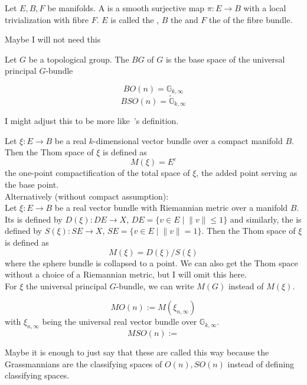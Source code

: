 \documentclass[a4paper,11pt]{article}
\begin{document}
\begin{definition}
    Let \(E,B,F\) be manifolds. A  is a smooth surjective map \(\pi:E\to B\) with a local trivialization with fibre \(F\).
    \(E\) is called the , \(B\) the  and \(F\) the  of the fibre bundle.
\end{definition}

Maybe I will not need this
\begin{definition}
    Let \(G\) be a topological group. The  \(BG\) of \(G\) is the base space of the universal principal \(G\)-bundle
\end{definition}

\begin{observation}
    \[BO(n)=\mathbb{G}_{k,\infty}\]
    \[BSO(n)=\widetilde{\mathbb{G}}_{k,\infty}\]
\end{observation}

I might adjust this to be more like\ \cite{thom}'s definition.
\begin{definition}
    Let \(\xi:E\to B\) be a real \(k\)-dimensional vector bundle over a compact manifold \(B\).
    Then the Thom space of \(\xi\) is defined as\[M(\xi)=E^c\] the one-point compactification of the total space of \(\xi\), the added point serving as the base point.\\
    Alternatively (without compact assumption):\\
    Let \(\xi:E\to B\) be a real vector bundle with Riemannian metric over a manifold \(B\). Its  is defined by \(D(\xi):DE\to X\), \(DE=\{v\in E\mid \lVert v\rVert \leq 1\}\) and similarly, the  is defined by \(S(\xi):SE\to X\), \(SE=\{v\in E\mid \lVert v\rVert = 1\}\). Then the Thom space of \(\xi\) is defined as
    \[M(\xi)=D(\xi)\big/S(\xi)\]
    where the sphere bundle is collapsed to a point. We can also get the Thom space without a choice of a Riemannian metric, but I will omit this here.\\
    For \(\xi\) the universal principal \(G\)-bundle, we can write \(M(G)\) instead of \(M(\xi)\).
\end{definition}

\begin{definition}
    \[MO(n):=M(\xi_{n,\infty})\] with \(\xi_{n,\infty}\) being the universal real vector bundle over \(\mathbb{G}_{k,\infty}\).
    \[MSO(n):=  \]
\end{definition}
Maybe it is enough to just say that these are called this way because the Grassmannians are the classifying spaces of \(O(n), SO(n)\) instead of defining classifying spaces.
\end{document}

